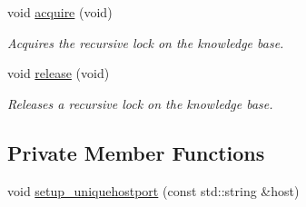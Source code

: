 \begin{DoxyCompactItemize}
void \hyperlink{classMadara_1_1Knowledge__Engine_1_1Knowledge__Base__Impl_ae6ea645beaa01759bc9b6549b81f8618}{acquire} (void)
\begin{DoxyCompactList}\small\item\em Acquires the recursive lock on the knowledge base. \item\end{DoxyCompactList}\item 
void \hyperlink{classMadara_1_1Knowledge__Engine_1_1Knowledge__Base__Impl_abf81aedee65d4ea1b8f0dc12455eaacb}{release} (void)
\begin{DoxyCompactList}\small\item\em Releases a recursive lock on the knowledge base. \item\end{DoxyCompactList}\end{DoxyCompactItemize}
\subsection*{Private Member Functions}
\begin{DoxyCompactItemize}
\item 
void \hyperlink{classMadara_1_1Knowledge__Engine_1_1Knowledge__Base__Impl_a2c4a8f22b5cbf22e854107a1a3ae7182}{setup\_\-uniquehostport} (const std::string \&host)
\end{DoxyCompactItemize}
